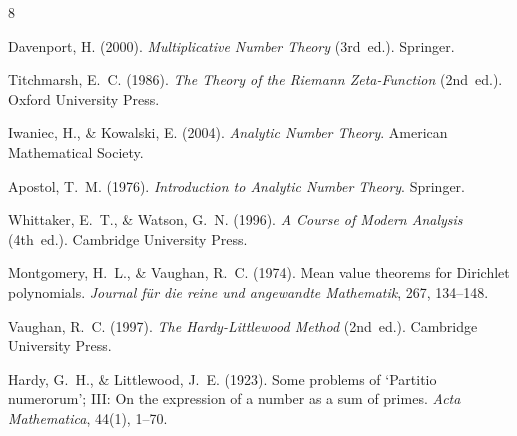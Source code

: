 \documentclass[11pt,a4paper]{article}
\theoremstyle{remark}
\begin{document}
\begin{thebibliography}{8}

Davenport, H. (2000).
\emph{Multiplicative Number Theory} (3rd~ed.).
Springer.

Titchmarsh, E.~C. (1986).
\emph{The Theory of the Riemann Zeta-Function} (2nd~ed.).
Oxford University Press.

Iwaniec, H., \& Kowalski, E. (2004).
\emph{Analytic Number Theory}.
American Mathematical Society.

Apostol, T.~M. (1976).
\emph{Introduction to Analytic Number Theory}.
Springer.

Whittaker, E.~T., \& Watson, G.~N. (1996).
\emph{A Course of Modern Analysis} (4th~ed.).
Cambridge University Press.

Montgomery, H.~L., \& Vaughan, R.~C. (1974).
Mean value theorems for Dirichlet polynomials.
\emph{Journal f\"ur die reine und angewandte Mathematik}, 267, 134--148.

Vaughan, R.~C. (1997).
\emph{The Hardy-Littlewood Method} (2nd~ed.).
Cambridge University Press.

Hardy, G.~H., \& Littlewood, J.~E. (1923).
Some problems of `Partitio numerorum'; III: On the expression of a number as a sum of primes.
\emph{Acta Mathematica}, 44(1), 1--70.

\end{thebibliography}
\end{document}
